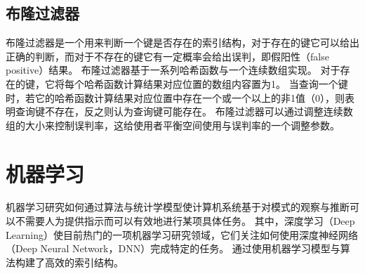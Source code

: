 \subsection{布隆过滤器}

布隆过滤器是一个用来判断一个键是否存在的索引结构，对于存在的键它可以给出正确的判断，而对于不存在的键它有一定概率会给出误判，即假阳性（false positive）结果。
布隆过滤器基于一系列哈希函数与一个连续数组实现。
对于存在的键，它将每个哈希函数计算结果对应位置的数组内容置为1。
当查询一个键时，若它的哈希函数计算结果对应位置中存在一个或一个以上的非1值（0），则表明查询键不存在，反之则认为查询键可能存在。
布隆过滤器可以通过调整连续数组的大小来控制误判率，这给使用者平衡空间使用与误判率的一个调整参数。




\section{机器学习}

机器学习研究如何通过算法与统计学模型使计算机系统基于对模式的观察与推断可以不需要人为提供指示而可以有效地进行某项具体任务。
其中，深度学习（Deep Learning）使目前热门的一项机器学习研究领域，它们关注如何使用深度神经网络（Deep Neural Network，DNN）完成特定的任务。
{\li}通过使用机器学习模型与算法构建了高效的索引结构。

